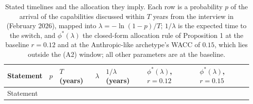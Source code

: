 \documentclass[
  11pt,
  letterpaper,
]{scrartcl}
\begin{document}
\begin{longtable}[]{@{}
  >{\raggedright\arraybackslash}p{}
  >{\raggedleft\arraybackslash}p{}
  >{\raggedleft\arraybackslash}p{}
  >{\raggedleft\arraybackslash}p{}
  >{\raggedleft\arraybackslash}p{}
  >{\raggedleft\arraybackslash}p{}
  >{\raggedleft\arraybackslash}p{}@{}}
\caption{Stated timelines and the allocation they imply. Each row is a
probability \(p\) of the arrival of the capabilities discussed within
\(T\) years from the interview in \citet{amodei2026dwarkesh} (February
2026), mapped into \(\lambda = -\ln(1-p)/T\); \(1/\lambda\) is the
expected time to the switch, and \(\phi^*(\lambda)\) the closed-form
allocation rule of Proposition 1 at the baseline \(r = 0.12\) and at the
Anthropic-like archetype's WACC of \(0.15\), which lies outside the (A2)
window; all other parameters are at the
baseline.}\label{tbl-stated-beliefs}\tabularnewline
\toprule\noalign{}
\begin{minipage}[b]{\linewidth}\raggedright
Statement
\end{minipage} & \begin{minipage}[b]{\linewidth}\raggedleft
\(p\)
\end{minipage} & \begin{minipage}[b]{\linewidth}\raggedleft
\(T\) (years)
\end{minipage} & \begin{minipage}[b]{\linewidth}\raggedleft
\(\lambda\)
\end{minipage} & \begin{minipage}[b]{\linewidth}\raggedleft
\(1/\lambda\) (years)
\end{minipage} & \begin{minipage}[b]{\linewidth}\raggedleft
\(\phi^*(\lambda)\), \(r = 0.12\)
\end{minipage} & \begin{minipage}[b]{\linewidth}\raggedleft
\(\phi^*(\lambda)\), \(r = 0.15\)
\end{minipage} \\
\midrule\noalign{}
\endfirsthead
\toprule\noalign{}
\begin{minipage}[b]{\linewidth}\raggedright
Statement
\end{minipage} & \begin{minipage}[b]{\linewidth}\raggedleft

\end{minipage}
\end{longtable}
\end{document}
